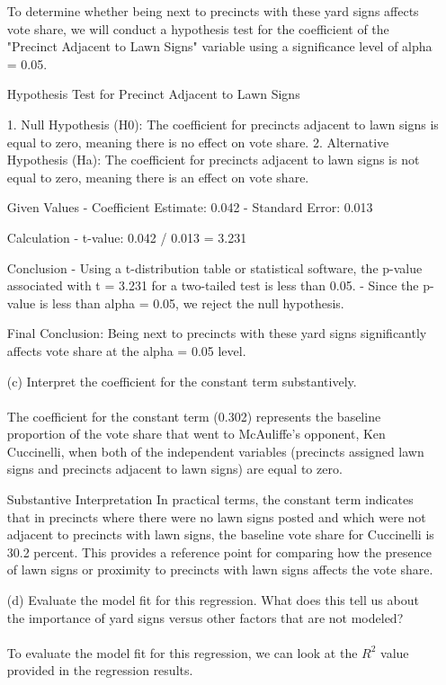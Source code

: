 \documentclass[12pt,letterpaper]{article}
\begin{document}
\begin{enumerate}
	To determine whether being next to precincts with these yard signs affects vote share, we will conduct a hypothesis test for the coefficient of the "Precinct Adjacent to Lawn Signs" variable using a significance level of alpha = 0.05.
	
	Hypothesis Test for Precinct Adjacent to Lawn Signs
	
	1. Null Hypothesis (H0): The coefficient for precincts adjacent to lawn signs is equal to zero, meaning there is no effect on vote share.
	2. Alternative Hypothesis (Ha): The coefficient for precincts adjacent to lawn signs is not equal to zero, meaning there is an effect on vote share.
	
	Given Values
	- Coefficient Estimate: 0.042
	- Standard Error: 0.013
	
	Calculation
	- t-value: 0.042 / 0.013 = 3.231
	
	Conclusion
	- Using a t-distribution table or statistical software, the p-value associated with t = 3.231 for a two-tailed test is less than 0.05.
	- Since the p-value is less than alpha = 0.05, we reject the null hypothesis.
	
	Final Conclusion: Being next to precincts with these yard signs significantly affects vote share at the alpha = 0.05 level.
	
	\vspace{1cm}
	\item [(c)] Interpret the coefficient for the constant term substantively.
	\\
	\\
	The coefficient for the constant term (0.302) represents the baseline proportion of the vote share that went to McAuliffe’s opponent, Ken Cuccinelli, when both of the independent variables (precincts assigned lawn signs and precincts adjacent to lawn signs) are equal to zero.
	
	Substantive Interpretation
	In practical terms, the constant term indicates that in precincts where there were no lawn signs posted and which were not adjacent to precincts with lawn signs, the baseline vote share for Cuccinelli is 30.2 percent. This provides a reference point for comparing how the presence of lawn signs or proximity to precincts with lawn signs affects the vote share.
	
	\vspace{1cm}
	
	\item [(d)] Evaluate the model fit for this regression.  What does this	tell us about the importance of yard signs versus other factors that are not modeled?
	\\
	\\
	To evaluate the model fit for this regression, we can look at the \( R^2 \) value provided in the regression results. 
	

\end{enumerate}
\end{document}
